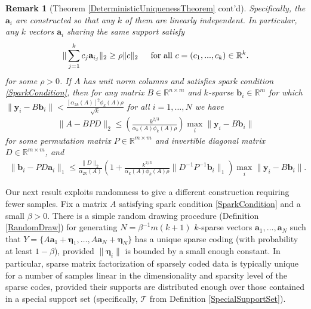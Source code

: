 \documentclass[journal, onecolumn]{IEEEtran}
\newtheorem{remark}{Remark}
\begin{document}

\begin{remark}[Theorem \ref{DeterministicUniquenessTheorem} cont'd]
Specifically, the $\mathbf{a}_i$ are constructed so that any $k$ of them are linearly independent. In particular, any $k$ vectors $\mathbf{a}_i$ sharing the same support satisfy
\begin{align}\label{DataSpread}
\|\sum_{j = 1}^k c_j \mathbf{a}_{i_j}\|_2 \geq \rho \|c\|_2 \indent \text{for all } c = (c_1, ..., c_k) \in \mathbb{R}^k.
\end{align}
%
for some $\rho > 0$. If $A$ has unit norm columns and satisfies spark condition \eqref{SparkCondition}, then for any matrix $B \in \mathbb{R}^{n \times m}$ and $k$-sparse $\mathbf{b}_i \in \mathbb{R}^m$ for which $\|\mathbf{y}_i - B\mathbf{b}_i\| < \frac{[\alpha_{2k}(A)]^2\phi_k(A)\rho}{\sqrt{k}}$ for all $i = 1, \ldots, N$ we have
\begin{align}
\|A - BPD\|_2 \leq \left(  \frac{k^{2/3}}{\alpha_{k}(A)\phi_k(A)\rho} \right) \max_i \|\mathbf{y}_i - B\mathbf{b}_i\|
\end{align}
%
for some permutation matrix $P \in \mathbb{R}^{m \times m}$ and invertible diagonal matrix $D \in \mathbb{R}^{m \times m}$, and
\begin{align}\label{b_PDa}
\|\mathbf{b}_i - PD\mathbf{a}_i\|_1 \leq \frac{ \|D\|_2}{\alpha_{2k}(A)}  \left( 1 + \frac{k^{2/3}}{\alpha_{k}(A)\phi_k(A)\rho}\|D^{-1}P^{-1}\mathbf{b}_i\|_1 \right) \max_i \|\mathbf{y}_i - B\mathbf{b}_i\|.
\end{align}
\end{remark}

Our next result exploits randomness to give a different construction requiring fewer samples. Fix a matrix $A$ satisfying spark condition \eqref{SparkCondition} and a small $\beta > 0$. There is a simple random drawing procedure (Definition \ref{RandomDraw}) for generating $N = \beta^{-1}m(k+1)$ $k$-sparse vectors $\mathbf{a}_1, \ldots, \mathbf{a}_N$ such that $Y = \{A\mathbf{a}_1 + \mathbf{\eta}_1, \ldots, A\mathbf{a}_N + \mathbf{\eta}_N\}$ has a unique sparse coding (with probability at least $1 - \beta$), provided $\|\mathbf{\eta}_i\|$ is bounded by a small enough constant. In particular, sparse matrix factorization of sparsely coded data is typically unique for a number of samples linear in the dimensionality and sparsity level of the sparse codes, provided their supports are distributed enough over those contained in a special support set (specifically, $\mathcal{T}$ from Definition \ref{SpecialSupportSet}).
\end{document}
